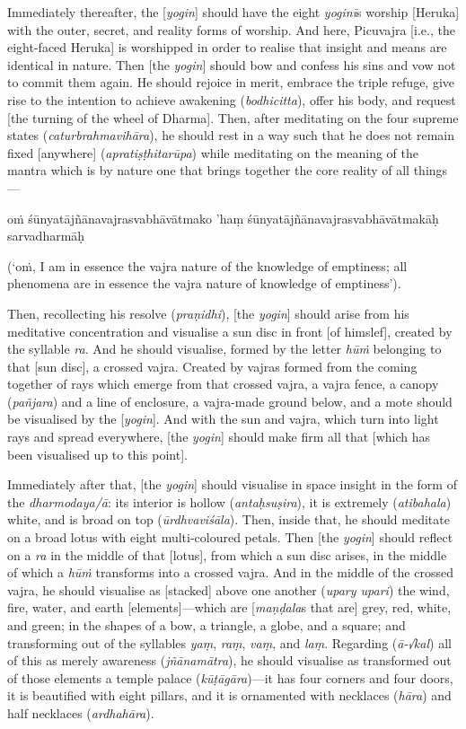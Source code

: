 \documentclass[naipra.tex]{subfiles}
\begin{document}
Immediately thereafter, the [\emph{yogin}] should have the eight \emph{yoginī}s worship [Heruka] with the outer, secret, and reality forms of worship. 
And here, Picuvajra [i.e., the eight-faced Heruka] is worshipped in order to realise that insight and means are identical in nature.
Then [the \emph{yogin}] should bow and confess his sins and vow not to commit them again.
He should rejoice in merit, embrace the triple refuge, give rise to the intention to achieve awakening (\emph{bodhicitta}), offer his body, and request [the turning of the wheel of Dharma].
Then, after meditating on the four supreme states (\emph{caturbrahmavihāra}), he should rest in a way such that he does not remain fixed [anywhere] (\emph{apratiṣṭhitarūpa}) while meditating on the meaning of the mantra which is by nature one that brings together the core reality of all things—\begin{mantra}oṁ śūnyatājñānavajrasvabhāvātmako 'haṃ śūnyatājñānavajrasvabhāvātmakāḥ sarvadharmāḥ\end{mantra} (`oṁ, I am in essence the vajra nature of the knowledge of emptiness; all phenomena are in essence the vajra nature of knowledge of emptiness').

Then, recollecting his resolve (\emph{praṇidhi}), [the \emph{yogin}] should arise from his meditative concentration and visualise a sun disc in front [of himslef], created by the syllable \emph{ra}.
And he should visualise, formed by the letter \emph{hūṁ} belonging to that [sun disc], a crossed vajra.
Created by vajras formed from the coming together of rays which emerge from that crossed vajra, a vajra fence, a canopy (\emph{pañjara}) and a line of enclosure, a vajra-made ground below, and a mote should be visualised by the [\emph{yogin}].
And with the sun and vajra, which turn into light rays and spread everywhere, [the \emph{yogin}] should make firm all that [which has been visualised up to this point].

Immediately after that, [the \emph{yogin}] should visualise in space insight in the form of the \emph{dharmodaya/ā}: its interior is hollow (\emph{antaḥsuṣira}), it is extremely (\emph{atibahala}) white, and is broad on top (\emph{ūrdhvaviśāla}).
Then, inside that, he should meditate on a broad lotus with eight multi-coloured petals.
Then [the \emph{yogin}] should reflect on a \emph{ra} in the middle of that [lotus], from which a sun disc arises, in the middle of which a \emph{hūṁ} transforms into a crossed vajra. 
And in the middle of the crossed vajra, he should visualise as [stacked] above one another (\emph{upary upari}) the wind, fire, water, and earth [elements]—which are [\emph{maṇḍala}s that are] grey, red, white, and green; in the shapes of a bow, a triangle, a globe, and a square; and transforming out of the syllables \emph{yaṃ}, \emph{raṃ}, \emph{vaṃ}, and \emph{laṃ}.
Regarding (\emph{ā-√kal}) all of this as merely awareness (\emph{jñānamātra}), he should visualise as transformed out of those elements a temple palace (\emph{kūṭāgāra})—it has four corners and four doors, it is beautified with eight pillars, and it is ornamented with necklaces (\emph{hāra}) and half necklaces (\emph{ardhahāra}).
\end{document}
